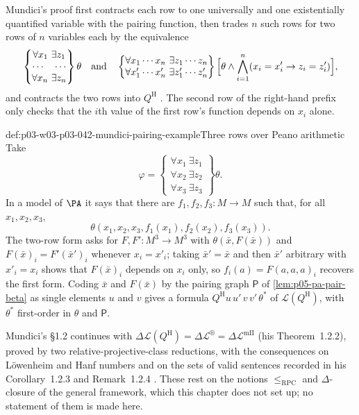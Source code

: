 Mundici's proof first contracts each row to one universally and one
existentially quantified variable with the pairing function, then trades
\(n\) such rows for two rows of \(n\) variables each by the equivalence
\[
 \begin{Bmatrix}\forall x_1\ \exists z_1\\ \cdots\quad\cdots\\
 \forall x_n\ \exists z_n\end{Bmatrix}\theta
 \quad\text{and}\quad
 \begin{Bmatrix}\forall x_1\cdots x_n\ \exists z_1\cdots z_n\\
 \forall x'_1\cdots x'_n\ \exists z'_1\cdots z'_n\end{Bmatrix}
 \Bigl[\theta\wedge\bigwedge_{i=1}^n(x_i=x'_i\to z_i=z'_i)\Bigr],
\]
and contracts the two rows into \(Q^{\mathrm H}\)
\cite[p.~214]{Mundici1985OtherQuantifiers}.  The second row of the
right-hand prefix only checks that the \(i\)th value of the first row's
function depends on \(x_i\) alone.

\begin{hbexample}{def:p03-w03-p03-042-mundici-pairing-example}{Three rows over Peano arithmetic}
Take
\[
 \varphi=\begin{Bmatrix}\forall x_1\ \exists z_1\\ \forall x_2\ \exists
 z_2\\ \forall x_3\ \exists z_3\end{Bmatrix}\theta .
\]
In a model of \(\PA\) it says that there are
\(f_1,f_2,f_3:M\to M\) such that, for all \(x_1,x_2,x_3\),
\[
 \theta(x_1,x_2,x_3,f_1(x_1),f_2(x_2),f_3(x_3)).
\]  The two-row form asks for
\(F,F':M^3\to M^3\) with \(\theta(\bar x,F(\bar x))\) and \(F(\bar
x)_i=F'(\bar x')_i\) whenever \(x_i=x'_i\); taking \(\bar x'=\bar x\) and
then \(\bar x'\) arbitrary with \(x'_i=x_i\) shows that \(F(\bar x)_i\)
depends on \(x_i\) only, so \(f_i(a)=F(a,a,a)_i\) recovers the first
form.  Coding \(\bar x\) and \(F(\bar x)\) by the pairing graph
\(\mathsf P\) of \cref{lem:p05-pa-pair-beta} as single elements \(u\) and
\(v\) gives a formula \(Q^{\mathrm H}u\,u'\,v\,v'\,\theta^\ast\) of
\(\mathscr L(Q^{\mathrm H})\), with \(\theta^\ast\) first-order in
\(\theta\) and \(\mathsf P\).
\end{hbexample}

Mundici's \S1.2 continues with \(\Delta\mathscr L(Q^{\mathrm H})=\Delta
\mathscr L^{\circledR}=\Delta\mathscr L^{\mathrm{mII}}\) (his
Theorem~1.2.2), proved by two relative-projective-class reductions, with
the consequences on L\"owenheim and Hanf numbers and on the sets of valid
sentences recorded in his Corollary~1.2.3 and Remark~1.2.4
\cite[pp.~214--216]{Mundici1985OtherQuantifiers}.  These rest on the
notions \(\leq_{\mathrm{RPC}}\) and \(\Delta\)-closure of the general
framework, which this chapter does not set up; no statement of them is
made here.

